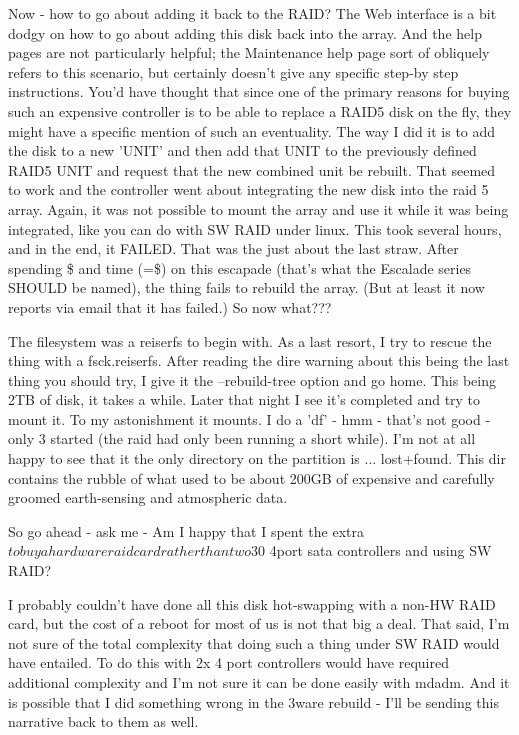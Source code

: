 \documentclass[12pt,twoside]{article}
\begin{document}
 Now - how to go about adding it back to the RAID?  The Web interface is a bit 
dodgy on how to go about adding this disk back into the array. And the help 
pages are not particularly helpful; the Maintenance help page sort of 
obliquely refers to this scenario, but certainly doesn't give any specific 
step-by step instructions.  You'd have thought that since one of the primary 
reasons for buying such an expensive controller is to be able to replace a RAID5 
disk on the fly, they might have a specific  mention of such an eventuality.   
The way I did it is to add the disk to a new 'UNIT' and then add that UNIT to 
the previously defined RAID5 UNIT and request that the new combined unit be 
rebuilt.  That seemed to work and the controller went about integrating the 
new disk into the raid 5 array.  Again, it was not possible to mount the 
array and use it while it was being integrated, like you can do with SW RAID 
under linux.  This took several hours, and in the end, it FAILED.  That was 
the just about the last straw.  After spending \$ and time (=\$) on 
this escapade (that's what the Escalade series SHOULD be named), the 
thing fails to rebuild the array.  (But at least it now reports via 
email that it has failed.) So now what???  

The filesystem was a reiserfs to begin with.  As a last resort, I try to 
rescue the thing with a fsck.reiserfs.  After reading the dire warning about 
this being the last thing you should try, I give it the --rebuild-tree option 
and go home.  This being 2TB of disk, it takes a while.  Later that night I 
see it's completed and try to mount it.  To my astonishment it mounts.  I do 
a 'df' - hmm - that's not good - only 3%
started (the raid had only been running a short while). I'm not at all happy 
to see that it the only directory on the partition is ... lost+found.  This 
dir contains the rubble of what used to be about 200GB of expensive and 
carefully groomed earth-sensing and atmospheric data. %

So go ahead - ask me - Am I happy that I spent the extra $ to buy a hardware 
raid card rather than two $30 4port sata controllers and using SW RAID?  

I probably couldn't have done all this disk hot-swapping with a non-HW RAID 
card, but the cost of a reboot for most of us is not that big a deal.  That 
said, I'm not sure of the total complexity that doing such a thing under SW 
RAID would have entailed. To do this with 2x 4 port controllers would have 
required additional complexity and I'm not sure it can be done easily with 
mdadm.  And it is possible that I did something wrong in the 3ware rebuild - 
I'll be sending this narrative back to them as well.
\end{document}
